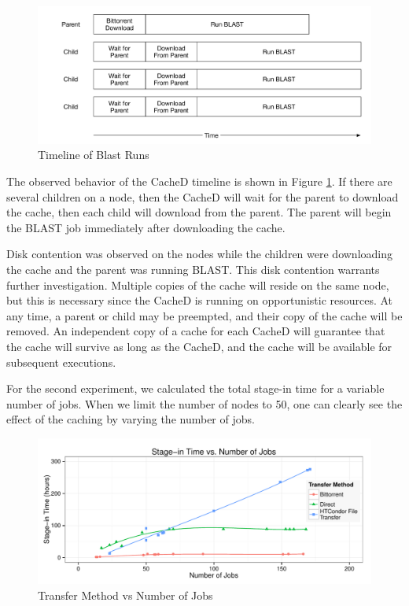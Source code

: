  

\begin{figure}[h!t]
\centering
\includegraphics[width=\textwidth]{images/BlastRunOverview.pdf}
\caption{Timeline of Blast Runs}
\label{fig:timelineblastruns}
\end{figure}

The observed behavior of the CacheD timeline is shown in Figure \ref{fig:timelineblastruns}.  If there are several children on a node, then the CacheD will wait for the parent to download the cache, then each child will download from the parent.  The parent will begin the BLAST job immediately after downloading the cache.  

Disk contention was observed on the nodes while the children were downloading the cache and the parent was running BLAST.  This disk contention warrants further investigation.  Multiple copies of the cache will reside on the same node, but this is necessary since the CacheD is running on opportunistic resources.  At any time, a parent or child may be preempted, and their copy of the cache will be removed.  An independent copy of a cache for each CacheD will guarantee that the cache will survive as long as the CacheD, and the cache will be available for subsequent executions.

For the second experiment, we calculated the total stage-in time for a variable number of jobs.  When we limit the number of nodes to 50, one can clearly see the effect of the caching by varying the number of jobs.

\begin{figure}[h!t]
\centering
\includegraphics[width=\textwidth]{images/StageinPlot.pdf}
\caption{Transfer Method vs Number of Jobs}
\label{fig:methodvsnumjobs}
\end{figure}

